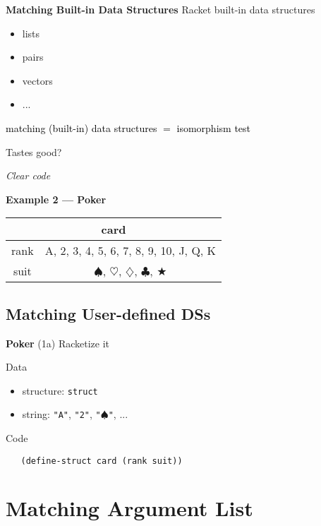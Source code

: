 \documentclass[12pt]{beamer}
\newcommand{\hl}[1]{\textcolor{black}{#1}}
\begin{document}
\begin{frame}{\bf Matching Built-in Data Structures}
 Racket built-in data structures
 \begin{itemize}
  \item lists
  \pause
  \item pairs
  \pause
  \item vectors
  \item ...
 \end{itemize}

 \pause

 \hl{matching (built-in) data structures $=$ isomorphism test}
\end{frame}

\begin{frame}[plain]
 \begin{center}
  {\LARGE
   Tastes good?
   
   \pause

   \em
   Clear code
  }
 \end{center}
\end{frame}

\begin{frame}[fragile]{\bf Example 2 --- Poker}
 \large
 \begin{table}
  \centering
  \begin{tabular}{c|c}
   \hline
   \multicolumn{2}{c}{card} \\
   \hline
   rank & A, 2, 3, 4, 5, 6, 7, 8, 9, 10, J, Q, K \\
   \hline
   suit & $\spadesuit$, $\heartsuit$, $\diamondsuit$, $\clubsuit$, $\bigstar$ \\
   \hline
  \end{tabular}
 \end{table}
\end{frame}

\subsection{Matching User-defined DSs}

\begin{frame}[fragile]{{\bf Poker} (1a)}
 Racketize it

 \pause

 Data
 \begin{itemize}
  \item structure: \verb|struct|
  \pause
  \item string: \verb|"A"|, \verb|"2"|, \verb|"|$\spadesuit$\verb|"|, ...
 \end{itemize}

 \pause

 Code
 {\footnotesize
  \begin{verbatim}
   (define-struct card (rank suit))
  \end{verbatim}
 }
\end{frame}

 

\section{Matching Argument List}
\end{document}
